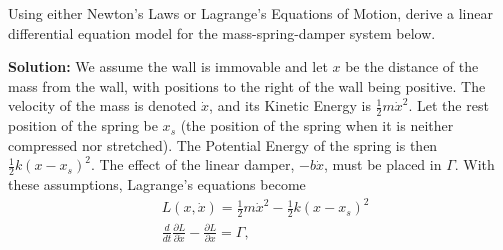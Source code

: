 \begin{example} 
\label{ex:MassSpringDamperNoGravity}
Using either Newton's Laws or Lagrange's Equations of Motion, derive a linear differential equation model for the mass-spring-damper system below. 

\begin{center}
\end{center}    
\end{example}
\textbf{Solution:} We assume the wall is immovable and let $x$ be the distance of the mass from the wall, with positions to the right of the wall being positive. The velocity of the mass is denoted $\dot{x}$, and its Kinetic Energy is $\frac{1}{2} m \dot{x}^2$. Let the rest position of the spring be $x_s$ (the position of the spring when it is neither compressed nor stretched). The Potential Energy of the spring is then $\frac{1}{2} k \left(x-x_s \right)^2$. The effect of the linear damper, $-b \dot{x}$, must be placed in $\Gamma$. With these assumptions, Lagrange's equations become
\begin{equation}
    \begin{aligned}
        &L(x, \dot{x})= \frac{1}{2} m \dot{x}^2 - \frac{1}{2} k \left(x-x_s \right)^2 \\[1em]
       & \frac{d}{dt}\frac{\partial L}{\partial \dot{x}}- \frac{\partial L}{\partial x} = \Gamma,
    \end{aligned}
\end{equation}
